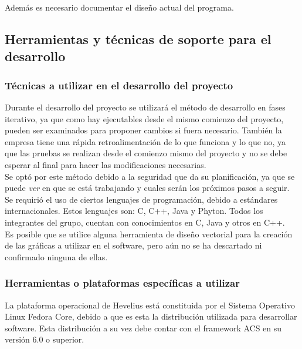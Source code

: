 \documentclass[letterpaper,titlepage,spanish,10pt]{article}
\begin{document}
Adem\'as es necesario documentar el dise\~no actual del programa.


\subsection{Herramientas y t\'ecnicas de soporte para el desarrollo}
\subsubsection{T\'ecnicas a utilizar en el desarrollo del proyecto}

Durante el desarrollo del proyecto se utilizar\'a el m\'etodo de desarrollo en fases iterativo, 
ya que como hay ejecutables desde el mismo comienzo del proyecto, pueden ser examinados 
para proponer cambios si fuera necesario. Tambi\'en la empresa tiene una r\'apida 
retroalimentaci\'on de lo que funciona y lo que no, ya que las pruebas se realizan desde el 
comienzo mismo del proyecto y no se debe esperar al final para hacer las modificaciones necesarias.\\

Se opt\'o por este m\'etodo debido a la seguridad que da su planificaci\'on, ya que se 
puede \textit{ver} en que se est\'a trabajando y cuales ser\'an los pr\'oximos pasos a seguir.\\

Se requiri\'o el uso de ciertos lenguajes 
de programaci\'on, debido a est\'andares internacionales. Estos lenguajes son: C, C++, Java y Phyton. 
Todos los integrantes del grupo, cuentan con conocimientos en C, Java y otros en C++.\\

Es posible que se utilice alguna herramienta de dise\~no vectorial para la creaci\'on de las gr\'aficas 
a utilizar en el software, pero a\'un no se ha descartado ni confirmado ninguna de ellas.\\


\subsubsection{Herramientas o plataformas espec\'ificas a utilizar}

La plataforma operacional de Hevelius est\'a constituida por el Sistema Operativo Linux Fedora Core, 
debido a que es esta la distribuci\'on utilizada para desarrollar software. Esta 
distribuci\'on a su vez debe contar con el framework ACS en su versi\'on 6.0 o superior.\\
\end{document}
